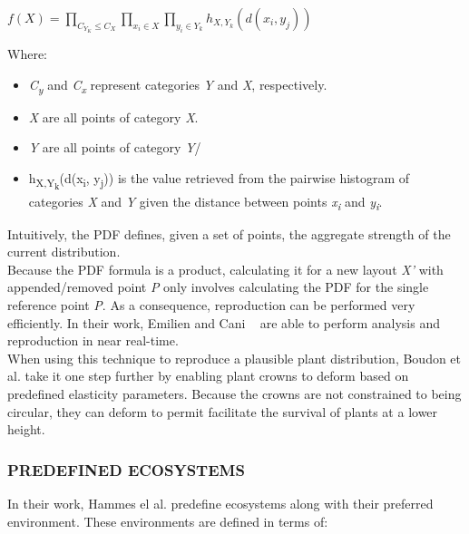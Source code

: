 \begin{center}
$ f(X) = \prod_{C_{Y_{K}} \leq C_{X}} 
		 \prod_{x_{i} \in X}
		 \prod_{y_{i} \in Y_{k}} 
		 h_{X,Y_{k}}(d(x_{i},y_{j}))$
\end{center} 

Where:
\begin{itemize}
\item \textit{C\textsubscript{y}} and \textit{C\textsubscript{x}} represent categories \textit{Y} and \textit{X}, respectively.
\item \textit{X} are all points of category \textit{X}.
\item \textit{Y} are all points of category \textit{Y}/
\item h\textsubscript{X,Y\textsubscript{k}}(d(x\textsubscript{i}, y\textsubscript{j})) is the value retrieved from the pairwise histogram of categories \textit{X} and \textit{Y} given the distance between points \textit{x\textsubscript{i}} and \textit{y\textsubscript{i}}.
\end{itemize}
Intuitively, the PDF defines, given a set of points, the aggregate strength of the current distribution.\\

Because the PDF formula is a product, calculating it for a new layout \textit{X'} with appended/removed point \textit{P} only involves calculating the PDF for the single reference point \textit{P}. As a consequence, reproduction can be performed very efficiently. In their work, Emilien and Cani ~\cite{Emilien} are able to perform analysis and reproduction in near real-time.\\

When using this technique to reproduce a plausible plant distribution, Boudon et al. \cite{Boudon2007} take it one step further by enabling plant crowns to deform based on predefined elasticity parameters. Because the crowns are not constrained to being circular, they can deform to permit facilitate the survival of plants at a lower height.

\subsubsection{PREDEFINED ECOSYSTEMS}
In their work, Hammes el al. \cite{Hammes2001} predefine ecosystems along with their preferred environment. These environments are defined in terms of:

